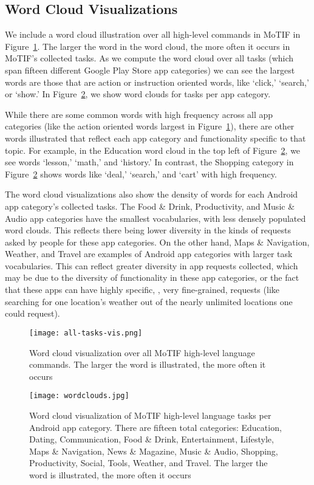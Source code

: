 \subsection{Word Cloud Visualizations}
\label{sec:wordcloud}
We include a word cloud illustration over all high-level commands in MoTIF in Figure~\ref{fig:word1}. The larger the word in the word cloud, the more often it occurs in MoTIF's collected tasks. As we compute the word cloud over all tasks (which span fifteen different Google Play Store app categories) we can see the largest words are those that are action or instruction oriented words, like `click,' `search,' or `show.' In Figure~\ref{fig:category_wordcloud}, we show word clouds for tasks per app category. 

While there are some common words with high frequency across all app categories (like the action oriented words largest in Figure~\ref{fig:word1}), there are other words illustrated that reflect each app category and functionality specific to that topic. For example, in the Education word cloud in the top left of Figure~\ref{fig:category_wordcloud}, we see words `lesson,' `math,' and `history.' In contrast, the Shopping category in Figure~\ref{fig:category_wordcloud} shows words like `deal,' `search,' and `cart' with high frequency.

The word cloud visualizations also show the density of words for each Android app category's collected tasks. The Food \& Drink, Productivity, and Music \& Audio app categories have the smallest vocabularies, with less densely populated word clouds. This reflects there being lower diversity in the kinds of requests asked by people for these app categories. On the other hand, Maps \& Navigation, Weather, and Travel are examples of Android app categories with larger task vocabularies. This can reflect greater diversity in app requests collected, which may be due to the diversity of functionality in these app categories, or the fact that these apps can have highly specific, \ie, very fine-grained, requests (like searching for one location's weather out of the nearly unlimited locations one could request). 
\begin{figure}[t]
    \centering
    \texttt{[image: all-tasks-vis.png]}
    \caption{Word cloud visualization over all MoTIF high-level language commands. The larger the word is illustrated, the more often it occurs}
    \label{fig:word1}
\end{figure}
\begin{figure}
    \centering
    \texttt{[image: wordclouds.jpg]}
    \caption{Word cloud visualization of MoTIF high-level language tasks per Android app category. There are fifteen total categories: Education, Dating, Communication, Food \& Drink, Entertainment, Lifestyle, Maps \& Navigation, News \& Magazine, Music \& Audio, Shopping, Productivity, Social, Tools, Weather, and Travel. The larger the word is illustrated, the more often it occurs}
    \label{fig:category_wordcloud}
\end{figure}

